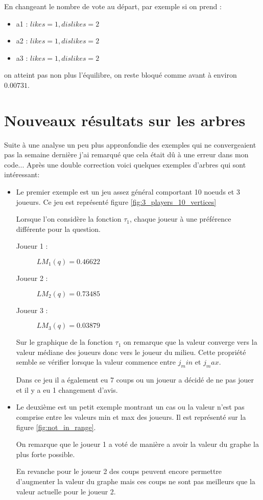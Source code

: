 \documentclass[12pt]{article}
\theoremstyle{defi}
\theoremstyle{not}
\theoremstyle{prob}
\begin{document}
    En changeant le nombre de vote au départ, par exemple si on prend :
    \begin{itemize}
      \item a1 : $likes = 1, dislikes = 2$
      \item a2 : $likes = 1, dislikes = 2$
      \item a3 : $likes = 1, dislikes = 2$
    \end{itemize}

    on atteint pas non plus l'équilibre, on reste bloqué comme avant à environ $0.00731$.
  \color{black}
  \section{Nouveaux résultats sur les arbres}
  \color{red}
    Suite à une analyse un peu plus appronfondie des exemples qui ne convergeaient pas la semaine dernière j'ai remarqué que cela était dû à une erreur dans mon code...
  \color{black}
    Après une double correction voici quelques exemples d'arbres qui sont intéressant:\\

    \begin{itemize}
      \item Le premier exemple est un jeu assez général comportant 10 noeuds et 3 joueurs.
        Ce jeu est représenté figure \ref{fig:3_players_10_vertices}

        Lorsque l'on considère la fonction $\tau_1$, chaque joueur à une préférence différente pour la question.
        \begin{description}
          \item[Joueur 1 : ] $LM_1(q) = 0.46622$
          \item[Joueur 2 : ] $LM_2(q) = 0.73485$
          \item[Joueur 3 : ] $LM_3(q) = 0.03879$
        \end{description}

        Sur le graphique de la fonction $\tau_1$ on remarque que la valeur converge vers la valeur médiane des joueurs donc vers le joueur du milieu. Cette propriété semble se vérifier lorsque la valeur commence entre $j_min$ et $j_max$.

        Dans ce jeu il a également eu 7 coups ou un joueur a décidé de ne pas jouer et il y a eu 1 changement d'avis.

      \item Le deuxième est un petit exemple montrant un cas ou la valeur n'est pas comprise entre les valeurs min et max des joueurs.
        Il est représenté sur la figure \ref{fig:not_in_range}.

        On remarque que le joueur 1 a voté de manière a avoir la valeur du graphe la plus forte possible.

        En revanche pour le joueur 2 des coups peuvent encore permettre d'augmenter la valeur du graphe mais ces coups ne sont pas meilleurs que la valeur actuelle pour le joueur 2.
    \end{itemize}
\end{document}
